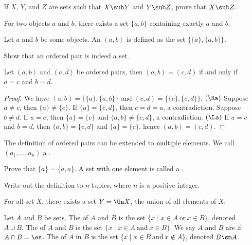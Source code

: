 \documentclass[10pt]{article}
\begin{document}
\begin{problem}
    If $X$, $Y$, and $Z$ are sets such that $X\sub Y$ and $Y\sub Z$, prove that $X\sub Z$.
\end{problem}
\begin{Axiom of pairing}
    For two objects $a$ and $b$, there exists a set $\{a,b\}$ containing exactly $a$ and $b$.
\end{Axiom of pairing}
\begin{definition}
    Let $a$ and $b$ be some objects. An  $(a,b)$ is defined as the set $\{\{a\},\{a,b\}\}$.
\end{definition}
\begin{problem}
    Show that an ordered pair is indeed a set.
\end{problem}
\begin{proposition}
    Let $(a,b)$ and $(c,d)$ be ordered pairs, then $(a,b)=(c,d)$ if and only if $a=c$ and $b=d$.
\end{proposition}
\begin{proof}
    We have $(a,b)=\{\{a\},\{a,b\}\}$ and $(c,d)=\{\{c\},\{c,d\}\}$. $(\Ra)$ Suppose $a\ne c$, then $\{a\}\ne\{c\}$. If $\{a\}=\{c,d\}$, then $c=d=a$, a contradiction. Suppose $b\ne d$. If $a=c$, then $\{a\}=\{c\}$ and $\{a,b\}\ne\{c,d\}$, a contradiction. $(\La)$ If $a=c$ and $b=d$, then $\{a,b\}=\{c,d\}$ and $\{a\}=\{c\}$, hence $(a,b)=(c,d)$.
\end{proof}
\par
The definition of ordered pairs can be extended to multiple elements. We call $({a}_{1},\dots,{a}_{n})$ a .
\begin{problem}
    Prove that $\{a\}=\{a,a\}$. A set with one element is called a .
\end{problem}
\begin{problem}
    Write out the definition to $n$-tuples, where $n$ is a positive integer.
\end{problem}
\begin{Axiom of union}
    For all set $X$, there exists a set $Y=\Un X$, the union of all elements of $X$.
\end{Axiom of union}
\begin{definition}
    Let $A$ and $B$ be sets. The  of $A$ and $B$ is the set $\{x\mid x\in A\ \text{or}\ x\in B\}$, denoted $A\cup B$. The  of $A$ and $B$ is the set $\{x\mid x\in A\ \text{and}\ x\in B\}$. We say $A$ and $B$ are  if $A\cap B=\es$. The  of $A$ in $B$ is the set $\{x\mid x\in B\ \text{and}\ x\notin A\}$, denoted $B\sm A$.
\end{definition}
\end{document}
